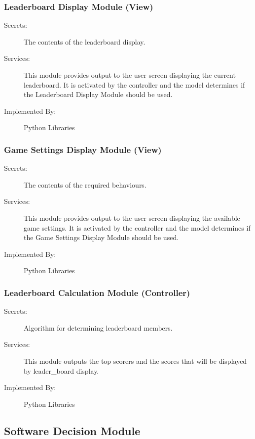 \documentclass[12pt, titlepage]{article}
\begin{document}
\subsubsection{Leaderboard Display Module (View)}
\begin{description}
\item[Secrets:]The contents of the leaderboard display.
\item[Services:] This module provides output to the user screen displaying the current leaderboard. It is activated by the controller and the model determines if the Leaderboard Display Module should be used.
\item[Implemented By:] Python Libraries
\end{description}

\subsubsection{Game Settings Display Module (View)}
\begin{description}
\item[Secrets:]The contents of the required behaviours.
\item[Services:] This module provides output to the user screen displaying the available game settings. It is activated by the controller and the model determines if the Game Settings Display Module should be used. 
\item[Implemented By:] Python Libraries
\end{description}

\subsubsection{Leaderboard Calculation Module (Controller)}
\begin{description}
\item[Secrets:] Algorithm for determining leaderboard members.
\item[Services:] This module outputs the top scorers and the scores that will be displayed by leader\_board display.
\item[Implemented By:] Python Libraries
\end{description}

\subsection{Software Decision Module}
\end{document}
